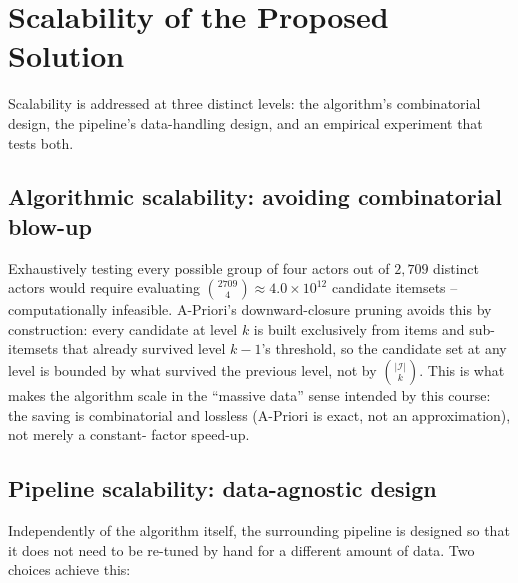 \documentclass[11pt,a4paper]{article}
\begin{document}
\section{Scalability of the Proposed Solution}
\label{sec:scalability}

Scalability is addressed at three distinct levels: the algorithm's
combinatorial design, the pipeline's data-handling design, and an empirical
experiment that tests both.

\subsection{Algorithmic scalability: avoiding combinatorial blow-up}

Exhaustively testing every possible group of four actors out of $2{,}709$
distinct actors would require evaluating $\binom{2709}{4} \approx 4.0 \times
10^{12}$ candidate itemsets -- computationally infeasible. A-Priori's
downward-closure pruning avoids this by
construction: every candidate at level $k$ is built exclusively from items and
sub-itemsets that already survived level $k-1$'s threshold, so the candidate
set at any level is bounded by what survived the previous level, not by
$\binom{|\mathcal{I}|}{k}$. This is what makes the algorithm scale in the
``massive data'' sense intended by this course: the saving is combinatorial
and lossless (A-Priori is exact, not an approximation), not merely a constant-
factor speed-up.

\subsection{Pipeline scalability: data-agnostic design}
\label{sec:threshold}

Independently of the algorithm itself, the surrounding pipeline is designed so
that it does not need to be re-tuned by hand for a different amount of data.
Two choices achieve this:
\end{document}
